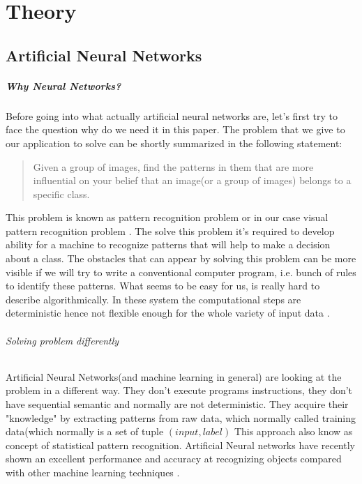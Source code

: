 \chapter{Theory}
\section{Artificial Neural Networks}
\paragraph{Why Neural Networks?}
\label{sec:neural_networks}
Before going into what actually artificial neural networks are, let's first
try to face the question why do we need it in this paper. The problem that
we give to our application to solve can be shortly summarized in the following statement:
\blockquote{
Given a group of images, find the patterns in them that are more influential
on your belief that an image(or a group of images) belongs to a specific class.
}


This problem is known as pattern recognition problem or in our case
visual pattern recognition problem \cite{Bishop1995}.
The solve this problem it's required to develop ability for a machine
to recognize patterns that will help to make a decision about a class.
The obstacles that can appear by solving this problem can be more visible
if we will try to write a conventional computer program, i.e. bunch of rules
to identify these patterns. What seems to be easy for us, is really hard to describe
algorithmically. In these system the computational steps are deterministic
hence not flexible enough for the whole variety of input data \cite{Nielsen2015}.

\subparagraph{Solving problem differently}
Artificial Neural Networks(and machine learning in general) are looking at the problem
in a different way.
They don't execute programs instructions, they don't have
sequential semantic and normally are not
deterministic. They acquire their "knowledge" by extracting patterns from raw data,
which normally called training data(which normally is a set of tuple $(input, label)$
This approach also know as concept of statistical pattern recognition. \cite{Bishop1995}
Artificial Neural networks have recently shown an excellent performance and
accuracy at recognizing objects compared with other
machine learning techniques \cite{Krizhevsky2012}.

